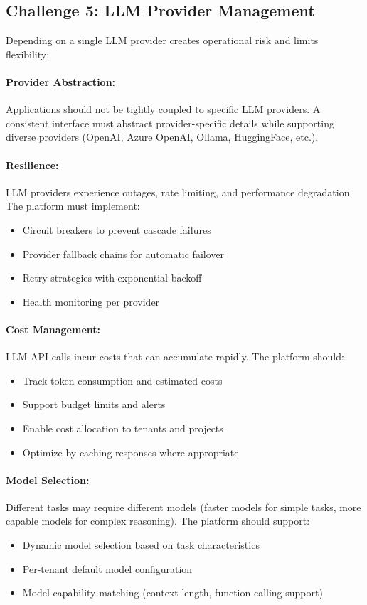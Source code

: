 \documentclass[a4paper,twoside]{sapthesis}
\begin{document}
\subsection{Challenge 5: LLM Provider Management}

Depending on a single LLM provider creates operational risk and limits flexibility:

\paragraph{Provider Abstraction:}
Applications should not be tightly coupled to specific LLM providers. A consistent interface must abstract provider-specific details while supporting diverse providers (OpenAI, Azure OpenAI, Ollama, HuggingFace, etc.).

\paragraph{Resilience:}
LLM providers experience outages, rate limiting, and performance degradation. The platform must implement:
\begin{itemize}
    \item Circuit breakers to prevent cascade failures
    \item Provider fallback chains for automatic failover
    \item Retry strategies with exponential backoff
    \item Health monitoring per provider
\end{itemize}

\paragraph{Cost Management:}
LLM API calls incur costs that can accumulate rapidly. The platform should:
\begin{itemize}
    \item Track token consumption and estimated costs
    \item Support budget limits and alerts
    \item Enable cost allocation to tenants and projects
    \item Optimize by caching responses where appropriate
\end{itemize}

\paragraph{Model Selection:}
Different tasks may require different models (faster models for simple tasks, more capable models for complex reasoning). The platform should support:
\begin{itemize}
    \item Dynamic model selection based on task characteristics
    \item Per-tenant default model configuration
    \item Model capability matching (context length, function calling support)
\end{itemize}
\end{document}
